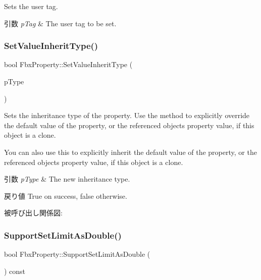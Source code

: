 Sets the user tag. 
\begin{DoxyParams}{引数}
{\em p\+Tag} & The user tag to be set. \\
\hline
\end{DoxyParams}
\mbox{\label{class_fbx_property_ad83cb36df88b5c088d955effd462d4be}} 
\subsubsection{\texorpdfstring{Set\+Value\+Inherit\+Type()}{SetValueInheritType()}}
{\footnotesize\ttfamily bool Fbx\+Property\+::\+Set\+Value\+Inherit\+Type (\begin{DoxyParamCaption}\item[{\hyperlink{class_fbx_property_flags_ae3b667a4fcac4b827fa186a698fec2f8}{Fbx\+Property\+Flags\+::\+E\+Inherit\+Type}}]{p\+Type }\end{DoxyParamCaption})}

Sets the inheritance type of the property. Use the method to explicitly override the default value of the property, or the referenced object\textquotesingle{}s property value, if this object is a clone.

You can also use this to explicitly inherit the default value of the property, or the referenced object\textquotesingle{}s property value, if this object is a clone.


\begin{DoxyParams}{引数}
{\em p\+Type} & The new inheritance type. \\
\hline
\end{DoxyParams}
\begin{DoxyReturn}{戻り値}
{\ttfamily True} on success, {\ttfamily false} otherwise. 
\end{DoxyReturn}
被呼び出し関係図\+:
\mbox{\label{class_fbx_property_a7f84a31a453f4e800e4440517418e7fe}} 
\subsubsection{\texorpdfstring{Support\+Set\+Limit\+As\+Double()}{SupportSetLimitAsDouble()}}
{\footnotesize\ttfamily bool Fbx\+Property\+::\+Support\+Set\+Limit\+As\+Double (\begin{DoxyParamCaption}{ }\end{DoxyParamCaption}) const}

